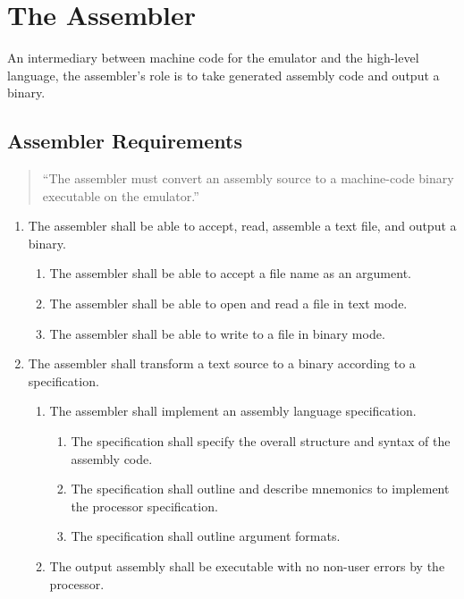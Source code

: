 \documentclass{article}
\begin{document}
\section{The Assembler}

An intermediary between machine code for the emulator and the high-level language, the assembler's role is to take generated assembly code and output a binary.

\subsection{Assembler Requirements}

\begin{quote}
    ``The assembler must convert an assembly source to a machine-code binary executable on the emulator.''
\end{quote}

\begin{enumerate}[label=R\arabic*]
    \item The assembler shall be able to accept, read, assemble a text file, and output a binary.
    \begin{enumerate}[label=\theenumi.\arabic*]
        \item The assembler shall be able to accept a file name as an argument.
        \item The assembler shall be able to open and read a file in text mode.
        \item The assembler shall be able to write to a file in binary mode.
    \end{enumerate}
    \item The assembler shall transform a text source to a binary according to a specification.
    \begin{enumerate}[label=\theenumi.\arabic*]
        \item The assembler shall implement an assembly language specification.
        \begin{enumerate}[label=\theenumii.\arabic*]
            \item The specification shall specify the overall structure and syntax of the assembly code.
            \item The specification shall outline and describe mnemonics to implement the processor specification.
            \item The specification shall outline argument formats.
        \end{enumerate}
        \item The output assembly shall be executable with no non-user errors by the processor.
    \end{enumerate}
\end{enumerate}
\end{document}
